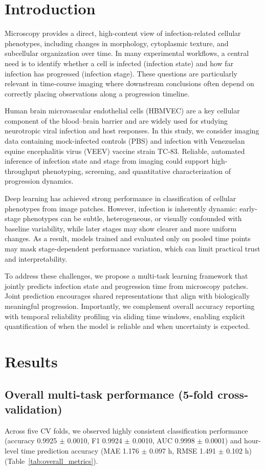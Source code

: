 \documentclass[journal,cells,article,submit,pdftex,moreauthors]{Definitions/mdpi}
\begin{document}
\section{Introduction}
Microscopy provides a direct, high-content view of infection-related cellular phenotypes, including changes in morphology, cytoplasmic texture, and subcellular organization over time. In many experimental workflows, a central need is to identify whether a cell is infected (infection state) and how far infection has progressed (infection stage). These questions are particularly relevant in time-course imaging where downstream conclusions often depend on correctly placing observations along a progression timeline.

Human brain microvascular endothelial cells (HBMVEC) are a key cellular component of the blood--brain barrier and are widely used for studying neurotropic viral infection and host responses. In this study, we consider imaging data containing mock-infected controls (PBS) and infection with Venezuelan equine encephalitis virus (VEEV) vaccine strain TC-83. Reliable, automated inference of infection state and stage from imaging could support high-throughput phenotyping, screening, and quantitative characterization of progression dynamics.

Deep learning has achieved strong performance in classification of cellular phenotypes from image patches. However, infection is inherently dynamic: early-stage phenotypes can be subtle, heterogeneous, or visually confounded with baseline variability, while later stages may show clearer and more uniform changes. As a result, models trained and evaluated only on pooled time points may mask stage-dependent performance variation, which can limit practical trust and interpretability.

To address these challenges, we propose a multi-task learning framework that jointly predicts infection state and progression time from microscopy patches. Joint prediction encourages shared representations that align with biologically meaningful progression. Importantly, we complement overall accuracy reporting with temporal reliability profiling via sliding time windows, enabling explicit quantification of when the model is reliable and when uncertainty is expected.

\section{Results}
\subsection{Overall multi-task performance (5-fold cross-validation)}
Across five CV folds, we observed highly consistent classification performance (accuracy 0.9925 \ensuremath{\pm} 0.0010, F1 0.9924 \ensuremath{\pm} 0.0010, AUC 0.9998 \ensuremath{\pm} 0.0001) and hour-level time prediction accuracy (MAE 1.176 \ensuremath{\pm} 0.097 h, RMSE 1.491 \ensuremath{\pm} 0.102 h) (Table~\ref{tab:overall_metrics}).
\end{document}
